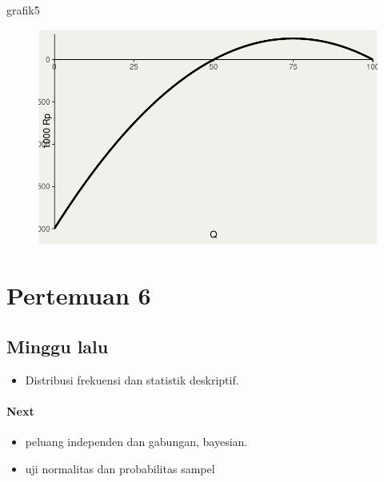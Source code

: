 \documentclass[
  letterpaper,
  DIV=11,
  numbers=noendperiod]{scrartcl}
\let\oldparagraph\paragraph
\renewcommand{\paragraph}[1]{\oldparagraph{#1}\mbox{}}
\newenvironment{Shaded}{\begin{snugshade}}{\end{snugshade}}
\newcommand{\NormalTok}[1]{\textcolor[rgb]{0.00,0.23,0.31}{#1}}
\providecommand{\tightlist}{%
  \setlength{\itemsep}{0pt}\setlength{\parskip}{0pt}}\usepackage{longtable,booktabs,array}
\begin{document}
\begin{Shaded}
\begin{Highlighting}[]
\NormalTok{grafik5}
\end{Highlighting}
\end{Shaded}

\begin{figure}[H]

{\centering \includegraphics{index_files/figure-pdf/unnamed-chunk-10-1.pdf}

}

\end{figure}

\hypertarget{pertemuan-6}{%
\section{Pertemuan 6}\label{pertemuan-6}}

\hypertarget{minggu-lalu}{%
\subsection{Minggu lalu}\label{minggu-lalu}}

\begin{itemize}
\tightlist
\item
  Distribusi frekuensi dan statistik deskriptif.
\end{itemize}

\hypertarget{next}{%
\paragraph{Next}\label{next}}

\begin{itemize}
\tightlist
\item
  peluang independen dan gabungan, bayesian.
\item
  uji normalitas dan probabilitas sampel
\end{itemize}
\end{document}
